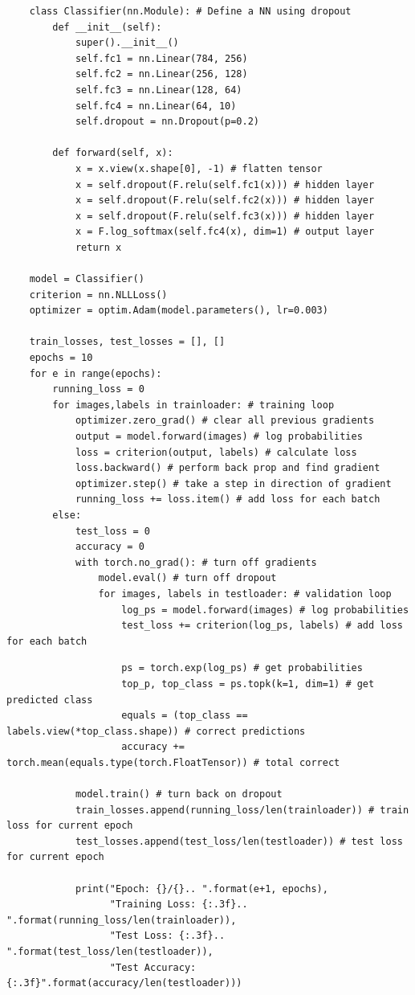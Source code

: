 \documentclass[11pt, a4paper]{article}
\begin{document}
\begin{spacing}{1.1}
\begin{lstlisting}
	class Classifier(nn.Module): # Define a NN using dropout
		def __init__(self):
			super().__init__()
			self.fc1 = nn.Linear(784, 256)
			self.fc2 = nn.Linear(256, 128)
			self.fc3 = nn.Linear(128, 64)
			self.fc4 = nn.Linear(64, 10)
			self.dropout = nn.Dropout(p=0.2) 
		
		def forward(self, x):
			x = x.view(x.shape[0], -1) # flatten tensor
			x = self.dropout(F.relu(self.fc1(x))) # hidden layer 
			x = self.dropout(F.relu(self.fc2(x))) # hidden layer 
			x = self.dropout(F.relu(self.fc3(x))) # hidden layer 
			x = F.log_softmax(self.fc4(x), dim=1) # output layer 
			return x
	
	model = Classifier()
	criterion = nn.NLLLoss()
	optimizer = optim.Adam(model.parameters(), lr=0.003)
	
	train_losses, test_losses = [], []
	epochs = 10
	for e in range(epochs):
		running_loss = 0
		for images,labels in trainloader: # training loop
			optimizer.zero_grad() # clear all previous gradients
			output = model.forward(images) # log probabilities 
			loss = criterion(output, labels) # calculate loss
			loss.backward() # perform back prop and find gradient
			optimizer.step() # take a step in direction of gradient
			running_loss += loss.item() # add loss for each batch
		else: 
			test_loss = 0
			accuracy = 0
			with torch.no_grad(): # turn off gradients
				model.eval() # turn off dropout
				for images, labels in testloader: # validation loop
					log_ps = model.forward(images) # log probabilities
					test_loss += criterion(log_ps, labels) # add loss for each batch
		\end{lstlisting} \newpage

	\begin{lstlisting}
					ps = torch.exp(log_ps) # get probabilities
					top_p, top_class = ps.topk(k=1, dim=1) # get predicted class
					equals = (top_class == labels.view(*top_class.shape)) # correct predictions
					accuracy += torch.mean(equals.type(torch.FloatTensor)) # total correct
		
			model.train() # turn back on dropout
			train_losses.append(running_loss/len(trainloader)) # train loss for current epoch
			test_losses.append(test_loss/len(testloader)) # test loss for current epoch
			
			print("Epoch: {}/{}.. ".format(e+1, epochs),
			      "Training Loss: {:.3f}.. ".format(running_loss/len(trainloader)),
			      "Test Loss: {:.3f}.. ".format(test_loss/len(testloader)),
			      "Test Accuracy: {:.3f}".format(accuracy/len(testloader)))
	

\end{lstlisting}
\end{spacing}
\end{document}
